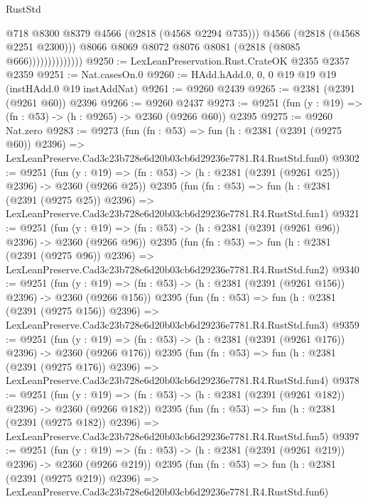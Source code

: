 \begin{lexlean}{RustStd}
\begin{coremodule}
                                @718
                                @8300
                                @8379
                                @4566
                                (@2818 (@4568 @2294 @735)))
                              @4566
                              (@2818 (@4568 @2251 @2300)))
                            @8066
                            @8069
                            @8072
                            @8076
                            @8081
                            (@2818 (@8085 @666))))))))))))))
@9250 := LexLeanPreservation.Rust.CrateOK @2355 @2357 @2359
@9251 := Nat.casesOn.{0}
@9260 := HAdd.hAdd.{0, 0, 0} @19 @19 @19 (instHAdd.{0} @19 instAddNat)
@9261 := @9260 @2439
@9265 := @2381 (@2391 (@9261 @60)) @2396
@9266 := @9260 @2437
@9273 := @9251 (fun (y : @19) => (fn : @53) -> (h : @9265) -> @2360 (@9266 @60)) @2395
@9275 := @9260 Nat.zero
@9283 := @9273
    (fun (fn : @53) =>
    fun (h : @2381 (@2391 (@9275 @60)) @2396) =>
    LexLeanPreserve.Cad3c23b728e6d20b03cb6d29236e7781.R4.RustStd.fun0)
@9302 := @9251
    (fun (y : @19) => (fn : @53) -> (h : @2381 (@2391 (@9261 @25)) @2396) -> @2360 (@9266 @25))
    @2395
    (fun (fn : @53) =>
    fun (h : @2381 (@2391 (@9275 @25)) @2396) =>
    LexLeanPreserve.Cad3c23b728e6d20b03cb6d29236e7781.R4.RustStd.fun1)
@9321 := @9251
    (fun (y : @19) => (fn : @53) -> (h : @2381 (@2391 (@9261 @96)) @2396) -> @2360 (@9266 @96))
    @2395
    (fun (fn : @53) =>
    fun (h : @2381 (@2391 (@9275 @96)) @2396) =>
    LexLeanPreserve.Cad3c23b728e6d20b03cb6d29236e7781.R4.RustStd.fun2)
@9340 := @9251
    (fun (y : @19) => (fn : @53) -> (h : @2381 (@2391 (@9261 @156)) @2396) -> @2360 (@9266 @156))
    @2395
    (fun (fn : @53) =>
    fun (h : @2381 (@2391 (@9275 @156)) @2396) =>
    LexLeanPreserve.Cad3c23b728e6d20b03cb6d29236e7781.R4.RustStd.fun3)
@9359 := @9251
    (fun (y : @19) => (fn : @53) -> (h : @2381 (@2391 (@9261 @176)) @2396) -> @2360 (@9266 @176))
    @2395
    (fun (fn : @53) =>
    fun (h : @2381 (@2391 (@9275 @176)) @2396) =>
    LexLeanPreserve.Cad3c23b728e6d20b03cb6d29236e7781.R4.RustStd.fun4)
@9378 := @9251
    (fun (y : @19) => (fn : @53) -> (h : @2381 (@2391 (@9261 @182)) @2396) -> @2360 (@9266 @182))
    @2395
    (fun (fn : @53) =>
    fun (h : @2381 (@2391 (@9275 @182)) @2396) =>
    LexLeanPreserve.Cad3c23b728e6d20b03cb6d29236e7781.R4.RustStd.fun5)
@9397 := @9251
    (fun (y : @19) => (fn : @53) -> (h : @2381 (@2391 (@9261 @219)) @2396) -> @2360 (@9266 @219))
    @2395
    (fun (fn : @53) =>
    fun (h : @2381 (@2391 (@9275 @219)) @2396) =>
    LexLeanPreserve.Cad3c23b728e6d20b03cb6d29236e7781.R4.RustStd.fun6)

\end{coremodule}
\end{lexlean}

